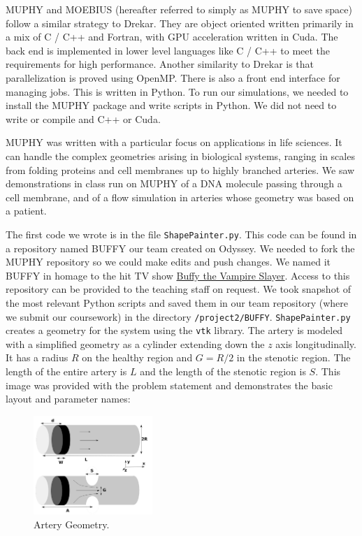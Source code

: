 \documentclass[11pt]{article} %
\newcommand{\tty}[1]{\texttt{#1}}
\begin{document}
MUPHY and MOEBIUS (hereafter referred to simply as MUPHY to save space) follow a similar strategy to Drekar.  
They are object oriented written primarily in a mix of C / C++ and Fortran, with GPU acceleration written in Cuda.
The back end is implemented in lower level languages like C / C++  to meet the requirements for high performance.
Another similarity to Drekar is that parallelization is proved using OpenMP.
There is also a front end interface for managing jobs.  This is written in Python.
To run our simulations, we needed to install the MUPHY package and write
scripts in Python.  We did not need to write or compile and C++ or Cuda.

MUPHY was written with a particular focus on applications in life sciences.
It can handle the complex geometries arising in biological systems, ranging in scales
from folding proteins and cell membranes up to highly branched arteries.
We saw demonstrations in class run on MUPHY of a DNA molecule passing through
a cell membrane, and of a flow simulation in arteries whose geometry was
based on a patient.

The first code we wrote is in the file \tty{ShapePainter.py}.
This code can be found in a repository named BUFFY our team created on Odyssey.
We needed to fork the MUPHY repository so we could make edits and push changes.
We named it BUFFY in homage to the hit TV show 
\href{https://en.wikipedia.org/wiki/Buffy_the_Vampire_Slayer}{Buffy the Vampire Slayer}.
Access to this repository can be provided to the teaching staff on request.
We took snapshot of the most relevant Python scripts and saved them in our
team repository (where we submit our coursework) in the directory \tty{/project2/BUFFY}.
\tty{ShapePainter.py} creates a geometry for the system using the \tty{vtk} library.
The artery is modeled with a simplified geometry 
as a cylinder extending down the $z$ axis longitudinally.
It has a radius $R$ on the healthy region and $G=R/2$ in the stenotic region.
The length of the entire artery is $L$ and the length of the stenotic region is $S$.
This image was provided with the problem statement and demonstrates
the basic layout and parameter names:
\begin{figure}[h!]
\centering
\includegraphics[width=0.40\textwidth]{artery_geometry.png}
\caption{Artery Geometry.}
\end{figure}
\end{document}
